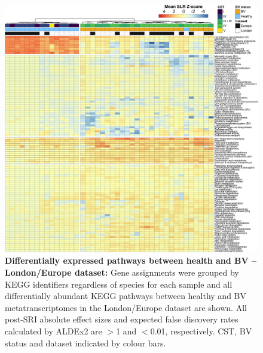 \documentclass[sn-mathphys,Numbered]{sn-jnl}%
\begin{document}
\begin{figure}[H]
    \centering
    \includegraphics[scale = 0.8125]{0_supplFig2.png}
    \caption{\textbf{Differentially expressed pathways between health and BV --London/Europe dataset:} Gene assignments were grouped by KEGG identifiers regardless of species for each sample and all differentially abundant KEGG pathways between healthy and BV metatranscriptomes in the London/Europe dataset are shown. All post-SRI absolute effect sizes and expected false discovery rates calculated by ALDEx2 are $>$1 and $<$0.01, respectively. CST, BV status and dataset indicated by colour bars.} \label{fig:sfigDifAbLonEurAll}
\end{figure}
\newpage
\end{document}
